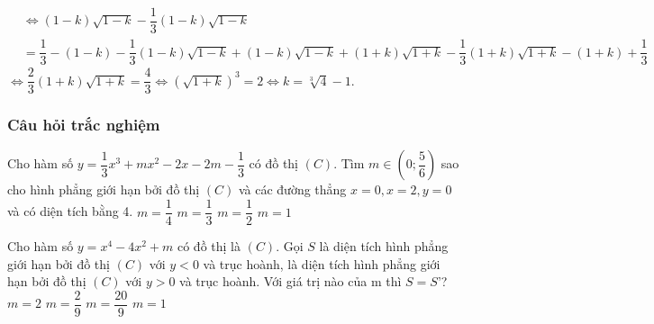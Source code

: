 \begin{vd}
{		$\begin{aligned}&\Leftrightarrow(1-k)\sqrt{1-k}-\dfrac{1}{3}(1-k)\sqrt{1-k}\\&=\dfrac{1}{3}-(1-k)-\dfrac{1}{3}(1-k)\sqrt{1-k}+(1-k)\sqrt{1-k}+(1+k)\sqrt{1+k}-\dfrac{1}{3}(1+k)\sqrt{1+k}-(1+k)+\dfrac{1}{3}\end{aligned}$ \\
		$ \Leftrightarrow\dfrac{2}{3}(1+k)\sqrt{1+k}=\dfrac{4}{3}\Leftrightarrow(\sqrt{1+k})^3=2\Leftrightarrow k=\sqrt[3]{4}-1 $.}
\end{vd}
\subsubsection{Câu hỏi trắc nghiệm}
\begin{ex}%
	Cho hàm số $y=\dfrac{1}{3}x^3+mx^2-2x-2m-\dfrac{1}{3}$ có đồ thị $(C)$. Tìm $m\in\left(0;\dfrac{5}{6}\right)$ sao cho hình phẳng giới hạn bởi đồ thị $(C)$ và các đường thẳng $x=0,x=2,y=0$ và có diện tích bằng 4. 
	\choice
	{$m=\dfrac{1}{4}$}
	{$m=\dfrac{1}{3}$}
	{\True $m=\dfrac{1}{2}$}
	{$m=1$}
\end{ex}
\begin{ex}%
\end{ex}
\begin{ex}%
	Cho hàm số $y=x^4-4x^2+m$ có đồ thị là $(C)$. Gọi $S$ là diện tích hình phẳng giới hạn bởi đồ thị $(C)$ với $y<0$ và trục hoành, là diện tích hình phẳng giới hạn bởi đồ thị $(C)$ với $y>0$ và trục hoành. Với giá trị nào của m thì $S=S’$?
	\choice
	{$m=2$}
	{$m=\dfrac{2}{9}$}
	{\True $m=\dfrac{20}{9}$}
	{$m=1$}
\end{ex}
